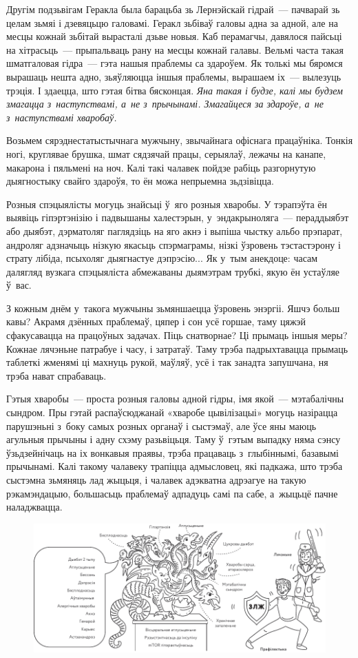Другім подзьвігам Геракла была барацьба зь Лернэйскай гідрай~--- пачварай зь целам зьмяі і дзевяцьцю галовамі. Геракл зьбіваў галовы адна за адной, але на месцы кожнай зьбітай вырасталі дзьве новыя. Каб перамагчы, давялося пайсьці на хітрасьць~--- прыпальваць рану на месцы кожнай галавы. Вельмі часта такая шматгаловая гідра~--- гэта нашыя праблемы са здароўем. Як толькі мы бяромся вырашаць нешта адно, зьяўляюцца іншыя праблемы, вырашаем іх~--- вылезуць трэція. І здаецца, што гэтая бітва бясконцая. \emph{Яна такая і будзе, калі мы будзем змагацца з~наступствамі, а~не з~прычынамі. Змагайцеся за здароўе, а~не з~наступствамі хваробаў.}

Возьмем сярэднестатыстычнага мужчыну, звычайнага офіснага працаўніка. Тонкія ногі, круглявае брушка, шмат сядзячай працы, серыялаў, лежачы на канапе, макарона і пяльмені на ноч. Калі такі чалавек пойдзе рабіць разгорнутую дыягностыку свайго здароўя, то ён можа непрыемна зьдзівіцца.

Розныя спэцыялісты могуць знайсьці ў~яго розныя хваробы. У тэрапэўта ён выявіць гіпэртэнізію і падвышаны халестэрын, у~эндакрыноляга~--- пераддыябэт або дыябэт, дэрматоляг паглядзіць на яго акнэ і выпіша чыстку альбо прэпарат, андроляг адзначыць нізкую якасьць спэрмаграмы, нізкі ўзровень тэстастэрону і страту лібіда, псыхоляг дыягнастуе дэпрэсію... Як у~тым анекдоце: часам далягляд вузкага спэцыяліста абмежаваны дыямэтрам трубкі, якую ён устаўляе ў~вас.

З кожным днём у~такога мужчыны зьмяншаецца ўзровень энэргіі. Яшчэ больш кавы? Акрамя дзённых праблемаў, цяпер і сон усё горшае, таму цяжэй сфакусавацца на працоўных задачах. Піць снатворнае? Ці прымаць іншыя меры? Кожнае лячэньне патрабуе і часу, і затратаў. Таму трэба падрыхтавацца прымаць таблеткі жменямі ці махнуць рукой, маўляў, усё і так занадта запушчана, ня трэба нават спрабаваць.

Гэтыя хваробы~--- проста розныя галовы адной гідры, імя якой~--- мэтабалічны сындром. Пры гэтай распаўсюджанай «хваробе цывілізацыі» могуць назірацца парушэньні з~боку самых розных органаў і сыстэмаў, але ўсе яны маюць агульныя прычыны і адну схэму разьвіцьця. Таму ў~гэтым выпадку няма сэнсу ўзьдзейнічаць на іх вонкавыя праявы, трэба працаваць з~глыбіннымі, базавымі прычынамі. Калі такому чалавеку трапіцца адмысловец, які падкажа, што трэба сыстэмна зьмяняць лад жыцьця, і чалавек адэкватна адрэагуе на такую рэкамэндацыю, большасьць праблемаў адпадуць самі па сабе, а~жыцьцё пачне наладжвацца.

\begin{figure}[htb!]
  \centering
  \includegraphics[width=\textwidth]{willpower/ch2/6.pdf}
\end{figure}

